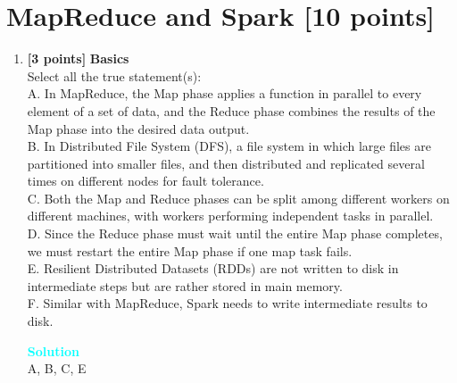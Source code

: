 \documentclass[10pt]{article}
\newenvironment{solution}
    { \begin{mdframed}[backgroundcolor=gray!10] \textcolor{cyan}{\textbf{Solution}} \\}
    {  \end{mdframed}}
\begin{document}
\newpage
\section{MapReduce and Spark \textbf{[10 points]}}

\begin{enumerate}

	\item \textbf{[3 points]} \textbf{Basics} \\
	      Select all the true statement(s): \\
	      A. In MapReduce, the Map phase applies a function in parallel to every element of a set of data, and the Reduce phase combines the
	      results of the Map phase into the desired data output. \\
	      B. In Distributed File System (DFS), a file system in which large files are partitioned into smaller files,
	      and then distributed and replicated several times on different nodes for fault tolerance. \\
	      C. Both the Map and Reduce phases can be split among different
	      workers on different machines, with workers performing independent tasks in parallel. \\
	      D. Since the Reduce phase must wait until the entire Map phase completes, we must restart the entire Map phase if one map task
	      fails. \\
	      E. Resilient Distributed Datasets (RDDs) are not written to disk in intermediate steps but are rather stored in main memory. \\
	      F. Similar with MapReduce, Spark needs to write intermediate results to disk.
	      \begin{solution}
		      A, B, C, E
	      \end{solution}



\end{enumerate}
\end{document}
